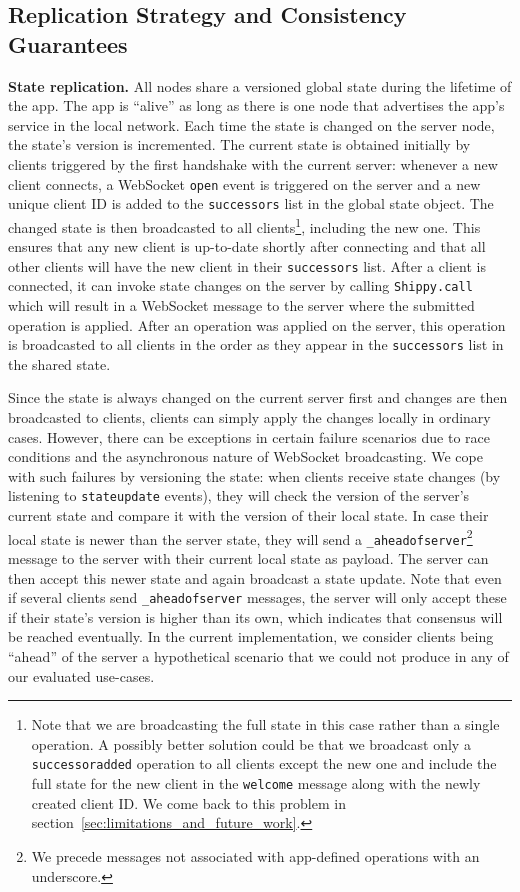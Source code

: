 \subsection{Replication Strategy and Consistency Guarantees}
\label{sub:approach_replication_strategy}

\textbf{State replication.}
All \APIshort nodes share a versioned global state during the lifetime of the app.
The app is ``alive'' as long as there is one node that advertises the app's service in the local network.
Each time the state is changed on the server node, the state's version is incremented.
The current state is obtained initially by clients triggered by the first handshake with the current server: whenever a new client connects, a WebSocket \texttt{open} event is triggered on the server and a new unique client ID is added to the \texttt{successors} list in the global state object.
The changed state is then broadcasted to all clients\footnote{Note that we are broadcasting the full state in this case rather than a single operation.
A possibly better solution could be that we broadcast only a \texttt{successoradded} operation to all clients except the new one and include the full state for the new client in the \texttt{welcome} message along with the newly created client ID. We come back to this problem in section~\ref{sec:limitations_and_future_work}.}, including the new one.
This ensures that any new client is up-to-date shortly after connecting and that all other clients will have the new client in their \texttt{successors} list.
After a client is connected, it can invoke state changes on the server by calling \texttt{Shippy.call} which will result in a WebSocket message to the server where the submitted operation is applied.
After an operation was applied on the server, this operation is broadcasted to all clients in the order as they appear in the \texttt{successors} list in the shared state.

Since the state is always changed on the current server first and changes are then broadcasted to clients, clients can simply apply the changes locally in ordinary cases.
However, there can be exceptions in certain failure scenarios due to race conditions and the asynchronous nature of WebSocket broadcasting.
We cope with such failures by versioning the state: when clients receive state changes (by listening to \texttt{stateupdate} events), they will check the version of the server's current state and compare it with the version of their local state.
In case their local state is newer than the server state, they will send a \texttt{\_aheadofserver}\footnote{We precede messages not associated with app-defined operations with an underscore.} message to the server with their current local state as payload.
The server can then accept this newer state and again broadcast a state update.
Note that even if several clients send \texttt{\_aheadofserver} messages, the server will only accept these if their state's version is higher than its own, which indicates that consensus will be reached eventually.
In the current \APIshort implementation, we consider clients being ``ahead'' of the server a hypothetical scenario that we could not produce in any of our evaluated use-cases.


